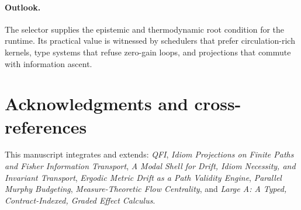 \documentclass[11pt]{article}
\theoremstyle{plain}
\theoremstyle{definition}
\theoremstyle{remark}
\newcommand{\1}{\mathds{1}}
\begin{document}
\paragraph{Outlook.} The selector supplies the epistemic and thermodynamic root condition for the runtime. Its practical value is witnessed by schedulers that prefer circulation-rich kernels, type systems that refuse zero-gain loops, and projections that commute with information ascent.

\section*{Acknowledgments and cross-references}
This manuscript integrates and extends: \emph{QFI}, \emph{Idiom Projections on Finite Paths and Fisher Information Transport}, \emph{A Modal Shell for Drift, Idiom Necessity, and Invariant Transport}, \emph{Ergodic Metric Drift as a Path Validity Engine}, \emph{Parallel Murphy Budgeting}, \emph{Measure-Theoretic Flow Centrality}, and \emph{Large A: A Typed, Contract-Indexed, Graded Effect Calculus}.



\end{document}
